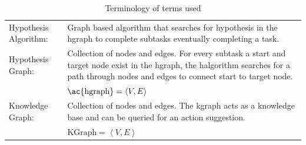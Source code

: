\begin{table}[ht!]
\begin{tabular}[t]{l p{10cm}}
Hypothesis Algorithm:& Graph based algorithm that searches for hypothesis in the \ac{hgraph} to complete subtasks eventually completing a task.\\
Hypothesis Graph:& Collection of nodes and edges. For every subtask a start and target node exist in the \ac{hgraph}, the \ac{halgorithm} searches for a path through nodes and edges to connect start to target node.\\
        & $ \textrm{\ac{hgraph}} = \left\langle V, E \right\rangle $\\
Knowledge Graph:& Collection of nodes and edges.  The \ac{kgraph} acts as a knowledge base and can be queried for an action suggestion.\\
        & $ \textrm{KGraph} = \left\langle V, E \right\rangle $\\
\end{tabular}
\caption{Terminology of terms used}
\label{table:proposed_method_terminology}
\end{table}




